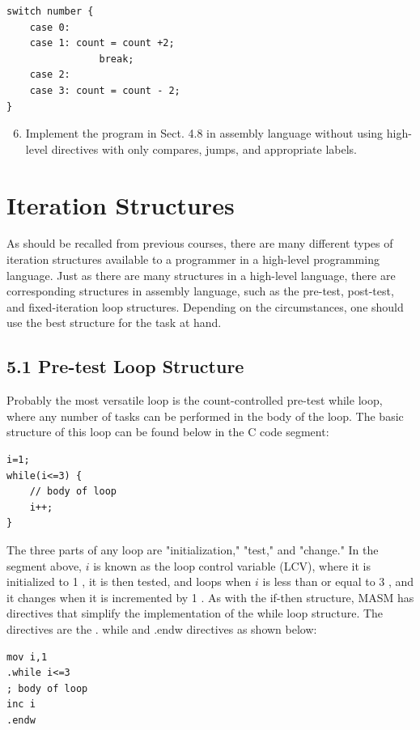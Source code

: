\documentclass[10pt]{article}
\begin{document}
\begin{verbatim}
switch number {
    case 0:
    case 1: count = count +2;
                break;
    case 2:
    case 3: count = count - 2;
}
\end{verbatim}

\begin{enumerate}
  \setcounter{enumi}{5}
  \item Implement the program in Sect. 4.8 in assembly language without using high-level directives with only compares, jumps, and appropriate labels.
\end{enumerate}

\section*{Iteration Structures}
As should be recalled from previous courses, there are many different types of iteration structures available to a programmer in a high-level programming language. Just as there are many structures in a high-level language, there are corresponding structures in assembly language, such as the pre-test, post-test, and fixed-iteration loop structures. Depending on the circumstances, one should use the best structure for the task at hand.

\subsection*{5.1 Pre-test Loop Structure}
Probably the most versatile loop is the count-controlled pre-test while loop, where any number of tasks can be performed in the body of the loop. The basic structure of this loop can be found below in the C code segment:

\begin{verbatim}
i=1;
while(i<=3) {
    // body of loop
    i++;
}
\end{verbatim}

The three parts of any loop are "initialization," "test," and "change." In the segment above, $i$ is known as the loop control variable (LCV), where it is initialized to 1 , it is then tested, and loops when $i$ is less than or equal to 3 , and it changes when it is incremented by 1 . As with the if-then structure, MASM has directives that simplify the implementation of the while loop structure. The directives are the . while and .endw directives as shown below:

\begin{verbatim}
mov i,1
.while i<=3
; body of loop
inc i
.endw
\end{verbatim}
\end{document}
